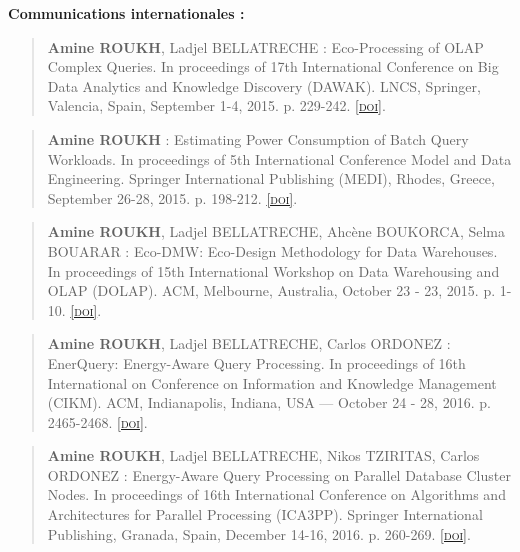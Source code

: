 \textbf{Communications internationales :}

\begin{quote}
	\cite{Roukh15a} \textbf{Amine ROUKH}, Ladjel BELLATRECHE : Eco-Processing of OLAP Complex Queries. In proceedings of 17th International Conference on Big Data Analytics and Knowledge Discovery (DAWAK). LNCS, Springer, Valencia, Spain, September 1-4, 2015. p. 229-242. \href{http://dx.doi.org/10.1007/978-3-319-22729-0_18}{\textsc{[doi]}}.                                                                                                                                                                                                                                                                               \end{quote} 

\begin{quote}
	\cite{Roukh15b} \textbf{Amine ROUKH} : Estimating Power Consumption of Batch Query Workloads. In proceedings of 5th International Conference Model and Data Engineering. Springer International Publishing (MEDI), Rhodes, Greece, September 26-28, 2015. p. 198-212. \href{http://dx.doi.org/10.1007/978-3-319-23781-7_16}{\textsc{[doi]}}.
\end{quote}

\begin{quote}
	\cite{Roukh15c} 
	\textbf{Amine ROUKH}, Ladjel BELLATRECHE, Ahcène BOUKORCA, Selma BOUARAR : Eco-DMW: Eco-Design Methodology for Data Warehouses.  In proceedings of 15th International Workshop on Data Warehousing and OLAP (DOLAP). ACM, Melbourne, Australia, October 23 - 23, 2015. p. 1-10. \href{http://dx.doi.org/10.1145/2811222.2811230}{\textsc{[doi]}}. 
\end{quote}

\begin{quote}
	\cite{Roukh16a} \textbf{Amine ROUKH}, Ladjel BELLATRECHE, Carlos ORDONEZ : EnerQuery: Energy-Aware Query Processing.  In proceedings of 16th International on Conference on Information and Knowledge Management (CIKM). ACM, Indianapolis, Indiana, USA — October 24 - 28, 2016. p. 2465-2468. \href{http://doi.acm.org/10.1145/2983323.2983334}{\textsc{[doi]}}.
\end{quote}

\begin{quote}
	\cite{Roukh16b} \textbf{Amine ROUKH}, Ladjel BELLATRECHE, Nikos TZIRITAS, Carlos ORDONEZ : Energy-Aware Query Processing on Parallel Database Cluster Nodes. In proceedings of 16th International Conference on Algorithms and Architectures for Parallel Processing (ICA3PP). Springer International Publishing, Granada, Spain, December 14-16, 2016. p. 260-269. \href{http://dx.doi.org/10.1007/978-3-319-49583-5_20}{\textsc{[doi]}}.
\end{quote}

